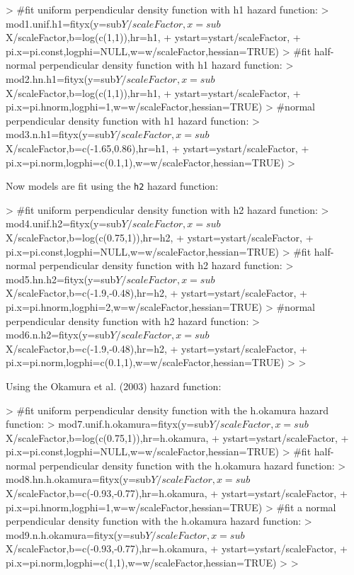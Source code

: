 \documentclass{article}
\begin{document}
\begin{Schunk}
\begin{Sinput}
> #fit uniform perpendicular density function with h1 hazard function:
> mod1.unif.h1=fityx(y=sub$Y/scaleFactor,x=sub$X/scaleFactor,b=log(c(1,1)),hr=h1,
+                  ystart=ystart/scaleFactor,
+                  pi.x=pi.const,logphi=NULL,w=w/scaleFactor,hessian=TRUE)
> #fit half-normal perpendicular density function with h1 hazard function:
> mod2.hn.h1=fityx(y=sub$Y/scaleFactor,x=sub$X/scaleFactor,b=log(c(1,1)),hr=h1,
+                ystart=ystart/scaleFactor,
+                  pi.x=pi.hnorm,logphi=1,w=w/scaleFactor,hessian=TRUE)
> #normal perpendicular density function with h1 hazard function:
> mod3.n.h1=fityx(y=sub$Y/scaleFactor,x=sub$X/scaleFactor,b=c(-1.65,0.86),hr=h1,
+               ystart=ystart/scaleFactor,
+                  pi.x=pi.norm,logphi=c(0.1,1),w=w/scaleFactor,hessian=TRUE)
> 
\end{Sinput}
\end{Schunk}
Now models are fit using the \texttt{h2} hazard function:
\begin{Schunk}
\begin{Sinput}
> #fit uniform perpendicular density function with h2 hazard function:
> mod4.unif.h2=fityx(y=sub$Y/scaleFactor,x=sub$X/scaleFactor,b=log(c(0.75,1)),hr=h2,
+                  ystart=ystart/scaleFactor,
+                  pi.x=pi.const,logphi=NULL,w=w/scaleFactor,hessian=TRUE)
> #fit half-normal perpendicular density function with h2 hazard function:
> mod5.hn.h2=fityx(y=sub$Y/scaleFactor,x=sub$X/scaleFactor,b=c(-1.9,-0.48),hr=h2,
+                ystart=ystart/scaleFactor,
+                  pi.x=pi.hnorm,logphi=2,w=w/scaleFactor,hessian=TRUE)
> #normal perpendicular density function with h2 hazard function:
> mod6.n.h2=fityx(y=sub$Y/scaleFactor,x=sub$X/scaleFactor,b=c(-1.9,-0.48),hr=h2,
+               ystart=ystart/scaleFactor,
+                  pi.x=pi.norm,logphi=c(0.1,1),w=w/scaleFactor,hessian=TRUE)
> 
> 
\end{Sinput}
\end{Schunk}
Using the Okamura et al. (2003) hazard function:
\begin{Schunk}
\begin{Sinput}
> #fit uniform perpendicular density function with the h.okamura hazard function:
> mod7.unif.h.okamura=fityx(y=sub$Y/scaleFactor,x=sub$X/scaleFactor,b=log(c(0.75,1)),hr=h.okamura,
+                  ystart=ystart/scaleFactor,
+                  pi.x=pi.const,logphi=NULL,w=w/scaleFactor,hessian=TRUE)
> #fit half-normal perpendicular density function with the h.okamura hazard function:
> mod8.hn.h.okamura=fityx(y=sub$Y/scaleFactor,x=sub$X/scaleFactor,b=c(-0.93,-0.77),hr=h.okamura,
+                ystart=ystart/scaleFactor,
+                  pi.x=pi.hnorm,logphi=1,w=w/scaleFactor,hessian=TRUE)
> #fit a normal perpendicular density function with the h.okamura hazard function:
> mod9.n.h.okamura=fityx(y=sub$Y/scaleFactor,x=sub$X/scaleFactor,b=c(-0.93,-0.77),hr=h.okamura,
+                ystart=ystart/scaleFactor,
+                  pi.x=pi.norm,logphi=c(1,1),w=w/scaleFactor,hessian=TRUE)
> 
> 
\end{Sinput}
\end{Schunk}
\end{document}
